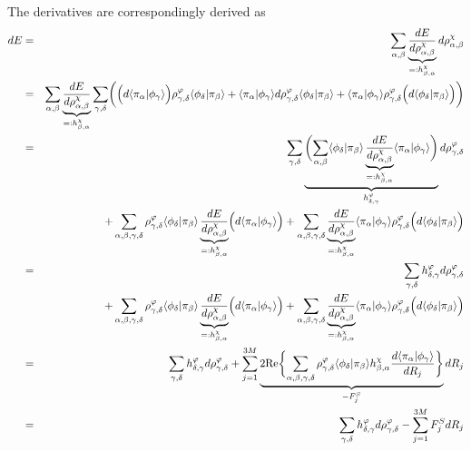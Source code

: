\documentclass[11pt,a4paper]{report}
\begin{document}
The derivatives are correspondingly derived as 
\begin{eqnarray}
dE
&=&\sum_{\alpha,\beta}\underbrace{\frac{dE}{d\rho^{\chi}_{\alpha,\beta}}}
_{=:h^{\chi}_{\beta,\alpha}}d\rho^{\chi}_{\alpha,\beta}
\nonumber\\
%
%
&=&\sum_{\alpha,\beta}
\underbrace{\frac{dE}{d\rho^{\chi}_{\alpha,\beta}}}
_{=:h^{\chi}_{\beta,\alpha}}
\sum_{\gamma,\delta}
\biggl(
\Bigl(d\langle\pi_\alpha|\phi_\gamma\rangle\Bigr)
\rho^{\varphi}_{\gamma,\delta}
\langle\phi_\delta|\pi_\beta\rangle
+
\langle\pi_\alpha|\phi_\gamma\rangle
d\rho^{\varphi}_{\gamma,\delta}
\langle\phi_\delta|\pi_\beta\rangle
+
\langle\pi_\alpha|\phi_\gamma\rangle
\rho^{\varphi}_{\gamma,\delta}
\Bigl(d\langle\phi_\delta|\pi_\beta\rangle\Bigr)
\biggr)
\nonumber\\
%
%
&=&
\sum_{\gamma,\delta}
\underbrace{\biggl(
\sum_{\alpha,\beta}
\langle\phi_\delta|\pi_\beta\rangle
\underbrace{\frac{dE}{d\rho^{\chi}_{\alpha,\beta}}}
_{=:h^{\chi}_{\beta,\alpha}}
\langle\pi_\alpha|\phi_\gamma\rangle
\biggr)}_{h^{\varphi}_{\delta,\gamma}}
d\rho^{\varphi}_{\gamma,\delta}
\nonumber\\
&&+
\sum_{\alpha,\beta,\gamma,\delta}
\rho^{\varphi}_{\gamma,\delta}
\langle\phi_\delta|\pi_\beta\rangle
\underbrace{\frac{dE}{d\rho^{\chi}_{\alpha,\beta}}}
_{=:h^{\chi}_{\beta,\alpha}}
\Bigl(d\langle\pi_\alpha|\phi_\gamma\rangle\Bigr)
+
\sum_{\alpha,\beta,\gamma,\delta}
\underbrace{\frac{dE}{d\rho^{\chi}_{\alpha,\beta}}}
_{=:h^{\chi}_{\beta,\alpha}}
\langle\pi_\alpha|\phi_\gamma\rangle
\rho^{\varphi}_{\gamma,\delta}
\Bigl(d\langle\phi_\delta|\pi_\beta\rangle\Bigr)
\nonumber\\
%
%
&=&
\sum_{\gamma,\delta}
h^{\varphi}_{\delta,\gamma}d\rho^{\varphi}_{\gamma,\delta}
\nonumber\\
&&+
\sum_{\alpha,\beta,\gamma,\delta}
\rho^{\varphi}_{\gamma,\delta}
\langle\phi_\delta|\pi_\beta\rangle
\underbrace{\frac{dE}{d\rho^{\chi}_{\alpha,\beta}}}
_{=:h^{\chi}_{\beta,\alpha}}
\Bigl(d\langle\pi_\alpha|\phi_\gamma\rangle\Bigr)
+
\sum_{\alpha,\beta,\gamma,\delta}
\underbrace{\frac{dE}{d\rho^{\chi}_{\alpha,\beta}}}
_{=:h^{\chi}_{\beta,\alpha}}
\langle\pi_\alpha|\phi_\gamma\rangle
\rho^{\varphi}_{\gamma,\delta}
\Bigl(d\langle\phi_\delta|\pi_\beta\rangle\Bigr)
\nonumber\\
%
%
&=&
\sum_{\gamma,\delta}
h^{\varphi}_{\delta,\gamma}d\rho^{\varphi}_{\gamma,\delta}
+
\sum_{j=1}^{3M} 
\underbrace{2\Re\biggl\lbrace
\sum_{\alpha,\beta,\gamma,\delta}
\rho^{\varphi}_{\gamma,\delta}
\langle\phi_\delta|\pi_\beta\rangle
h^{\chi}_{\beta,\alpha}
\frac{d\langle\pi_\alpha|\phi_\gamma\rangle}{dR_j}
\biggr\rbrace}_{-F^{S}_j} dR_j
\nonumber\\
%
%
&=&
\sum_{\gamma,\delta}
h^{\varphi}_{\delta,\gamma}d\rho^{\varphi}_{\gamma,\delta}
-\sum_{j=1}^{3M} F^{S}_j dR_j
\end{eqnarray}
\end{document}
